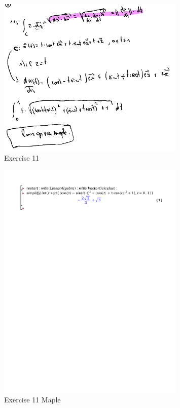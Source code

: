 \documentclass[a4paper]{article}
\begin{document}
\begin{figure}[H]
	\centering
	\includegraphics[width=0.8\textwidth]{assets/huis_6_ex_11.png}
	\caption{Exercise 11}
	\label{fig:huis_6_ex_11}
\end{figure}


\begin{figure}[H]
	\centering
	\includegraphics[width=0.8\textwidth]{exercises/huis_6_ex_11.pdf}
	\caption{Exercise 11 Maple}
	\label{fig:huis_6_ex_11_maple}
\end{figure}
\end{document}
